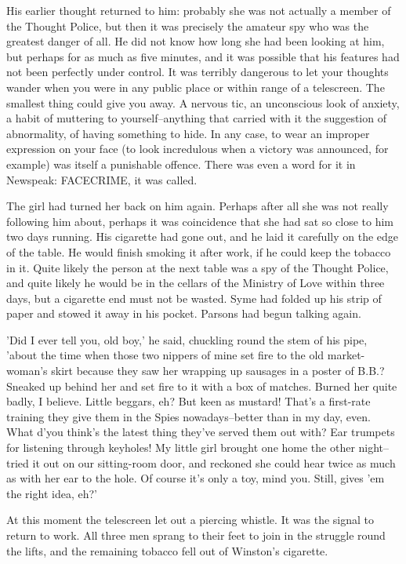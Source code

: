 \documentclass{article}
\begin{document}
His earlier thought returned to him: probably she was not actually a member
of the Thought Police, but then it was precisely the amateur spy who was
the greatest danger of all. He did not know how long she had been looking
at him, but perhaps for as much as five minutes, and it was possible
that his features had not been perfectly under control. It was terribly
dangerous to let your thoughts wander when you were in any public place
or within range of a telescreen. The smallest thing could give you away.
A nervous tic, an unconscious look of anxiety, a habit of muttering to
yourself--anything that carried with it the suggestion of abnormality, of
having something to hide. In any case, to wear an improper expression on
your face (to look incredulous when a victory was announced, for example)
was itself a punishable offence. There was even a word for it in Newspeak:
FACECRIME, it was called.

The girl had turned her back on him again. Perhaps after all she was not
really following him about, perhaps it was coincidence that she had sat so
close to him two days running. His cigarette had gone out, and he laid it
carefully on the edge of the table. He would finish smoking it after work,
if he could keep the tobacco in it. Quite likely the person at the next
table was a spy of the Thought Police, and quite likely he would be in the
cellars of the Ministry of Love within three days, but a cigarette end
must not be wasted. Syme had folded up his strip of paper and stowed it
away in his pocket. Parsons had begun talking again.

'Did I ever tell you, old boy,' he said, chuckling round the stem of his
pipe, 'about the time when those two nippers of mine set fire to the old
market-woman's skirt because they saw her wrapping up sausages in a poster
of B.B.? Sneaked up behind her and set fire to it with a box of matches.
Burned her quite badly, I believe. Little beggars, eh? But keen as mustard!
That's a first-rate training they give them in the Spies nowadays--better
than in my day, even. What d'you think's the latest thing they've served
them out with? Ear trumpets for listening through keyholes! My little
girl brought one home the other night--tried it out on our sitting-room
door, and reckoned she could hear twice as much as with her ear to the
hole. Of course it's only a toy, mind you. Still, gives 'em the right
idea, eh?'

At this moment the telescreen let out a piercing whistle. It was the
signal to return to work. All three men sprang to their feet to join in
the struggle round the lifts, and the remaining tobacco fell out of
Winston's cigarette.
\end{document}

